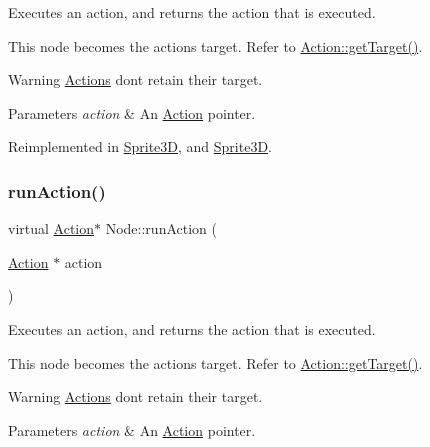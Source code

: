 Executes an action, and returns the action that is executed.

This node becomes the action\textquotesingle{}s target. Refer to \hyperlink{classAction_a696d1ef82807cc18207ba93d59d6ca16}{Action\+::get\+Target()}. \begin{DoxyWarning}{Warning}
\hyperlink{classActions}{Actions} don\textquotesingle{}t retain their target.
\end{DoxyWarning}

\begin{DoxyParams}{Parameters}
{\em action} & An \hyperlink{classAction}{Action} pointer. \\
\hline
\end{DoxyParams}


Reimplemented in \hyperlink{classSprite3D_acd2905d934e4d7c873b8a1973297d2a8}{Sprite3D}, and \hyperlink{classSprite3D_a6447200e96db21bc79df873e598fcf4a}{Sprite3D}.

\mbox{\label{classNode_a7af4b13a5b4a595b94d788aaf1961b30}} 
\subsubsection{\texorpdfstring{run\+Action()}{runAction()}\hspace{0.1cm}{\footnotesize\ttfamily [2/2]}}
{\footnotesize\ttfamily virtual \hyperlink{classAction}{Action}$\ast$ Node\+::run\+Action (\begin{DoxyParamCaption}\item[{\hyperlink{classAction}{Action} $\ast$}]{action }\end{DoxyParamCaption})\hspace{0.3cm}{\ttfamily [virtual]}}

Executes an action, and returns the action that is executed.

This node becomes the action\textquotesingle{}s target. Refer to \hyperlink{classAction_a696d1ef82807cc18207ba93d59d6ca16}{Action\+::get\+Target()}. \begin{DoxyWarning}{Warning}
\hyperlink{classActions}{Actions} don\textquotesingle{}t retain their target.
\end{DoxyWarning}

\begin{DoxyParams}{Parameters}
{\em action} & An \hyperlink{classAction}{Action} pointer. \\
\hline
\end{DoxyParams}


